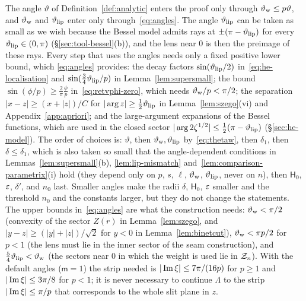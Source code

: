 \begin{remark}\label{rem:angles}
The angle $\vartheta$ of Definition~\ref{def:analytic} enters the proof only through $\vartheta_{\mathrm{w}}\le p\vartheta$, and $\vartheta_{\mathrm{w}}$
and $\vartheta_{\mathrm{lip}}$ enter only through~\eqref{eq:angles}. The angle $\vartheta_{\mathrm{lip}}$ can be taken as small as we wish because the
Bessel model admits rays at $\pm(\pi-\vartheta_{\mathrm{lip}})$ for every $\vartheta_{\mathrm{lip}}\in(0,\pi)$ (\S\ref{sec:tool-bessel}(b)), and the lens
near $0$ is then the preimage of these rays. Every step that uses the angles needs only a fixed positive lower bound,
which \eqref{eq:angles} provides: the decay factors $\sin(\vartheta_{\mathrm{lip}}/2)$ in~\eqref{eq:he-localisation} and
$\sin(\frac34\vartheta_{\mathrm{lip}}/p)$ in Lemma~\ref{lem:supersmall}; the bound $\sin(\phi/p)\ge\frac2\pi\frac\phi p$
in~\eqref{eq:retvphi-zero}, which needs $\vartheta_{\mathrm{w}}/p<\pi/2$; the separation $|x-z|\ge(x+|z|)/C$ for
$|\arg z|\ge\frac12\vartheta_{\mathrm{lip}}$ in Lemma~\ref{lem:szego}(vi) and Appendix~\ref{app:apriori}; and the large-argument
expansions of the Bessel functions, which are used in the closed sector $|\arg2\zeta^{1/2}|\le\frac12(\pi-\vartheta_{\mathrm{lip}})$
(\S\ref{sec:he-model}). The order of choices is: $\vartheta$, then $\vartheta_{\mathrm{w}},\vartheta_{\mathrm{lip}}$ by~\eqref{eq:thetaw}, then $\delta_1$,
then $\delta\le\delta_1$, which is also taken so small that the angle-dependent conditions in
Lemmas~\ref{lem:supersmall}(b), \ref{lem:lip-mismatch} and~\ref{lem:comparison-parametrix}(i) hold (they depend only on
$p$, $s$, $\ell$, $\vartheta_{\mathrm{w}}$, $\vartheta_{\mathrm{lip}}$, never on $n$), then $\mathsf H_0$, $\varepsilon$, $\delta'$, and $n_0$ last. Smaller angles make
the radii $\delta$, $\mathsf H_0$, $\varepsilon$ smaller and the threshold $n_0$ and the constants larger, but they do not change the
statements. The upper bounds in~\eqref{eq:angles} are what the construction needs: $\vartheta_{\mathrm{w}}<\pi/2$ (convexity of the
sector $Z(r)$ in Lemma~\ref{lem:szego}, and $|y-z|\ge(|y|+|z|)/\sqrt2$ for $y<0$ in Lemma~\ref{lem:binetcut}),
$\vartheta_{\mathrm{w}}<\pi p/2$ for $p<1$ (the lens must lie in the inner sector of the seam construction), and $\frac54\vartheta_{\mathrm{lip}}<\vartheta_{\mathrm{w}}$
(the sectors near $0$ in which the weight is used lie in $\mathcal{Z}_n$). With the default angles ($\mathsf m=1$) the strip
needed is $|\operatorname{Im}\xi|\le7\pi/(16p)$ for $p\ge1$ and $|\operatorname{Im}\xi|\le3\pi/8$ for $p<1$; it is never necessary to continue
$\Lambda$ to the strip $|\operatorname{Im}\xi|\le\pi/p$ that corresponds to the whole slit plane in $z$.
\end{remark}

